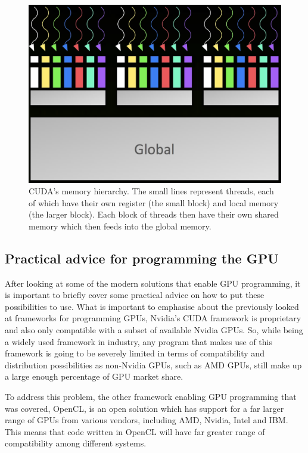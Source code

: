 \documentclass[a4paper,11pt]{article}
\begin{document}
\begin{figure}[ht]
  \centering
  \includegraphics[scale=0.3]{img/cuda-mem}
  \caption{CUDA's memory hierarchy. The small lines represent threads, each of which have their own register (the small
  block) and local memory (the larger block). Each block of threads then have their own shared memory which then feeds
  into the global memory.~\cite{slides:CUDAOverview}}
\label{fig:cuda-mem}
\end{figure}



\subsection{Practical advice for programming the GPU} %
\label{sub:practical_advice_in_programming_the_gpu}
After looking at some of the modern solutions that enable GPU programming, it is important to briefly cover some practical
advice on how to put these possibilities to use. What is important to emphasise about the previously looked at frameworks for
programming GPUs, Nvidia's CUDA framework is proprietary and also only compatible with a subset of available Nvidia GPUs.
So, while being a widely used framework in industry, any program that makes use of this framework is going to be severely
limited in terms of compatibility and distribution possibilities as non-Nvidia GPUs, such as AMD GPUs, still make up a
large enough percentage of GPU market share.

To address this problem, the other framework enabling GPU programming that was covered, OpenCL, is an open
solution which has support for a far larger range of GPUs from various vendors, including AMD, Nvidia, Intel and IBM.
This means that code written in OpenCL will have far greater range of compatibility among different systems.
\end{document}

